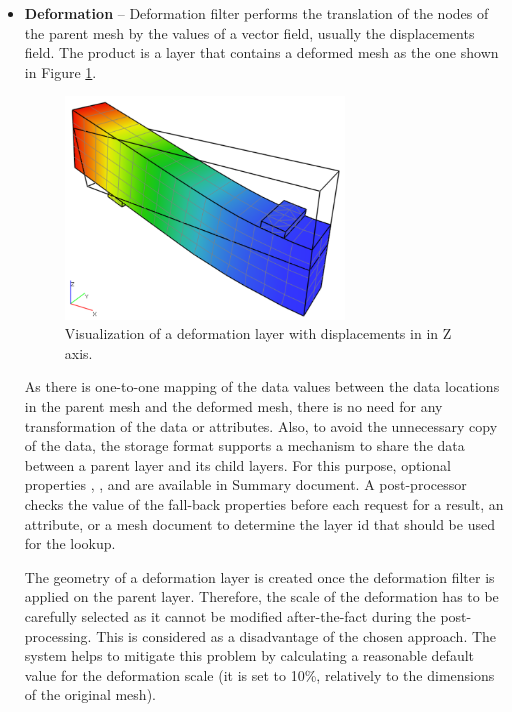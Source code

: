 \begin{itemize}

    \item \textbf{Deformation} -- Deformation filter performs the translation of the nodes of the parent mesh by the values of a vector field, usually the displacements field. The product is a layer that contains a deformed mesh as the one shown in Figure \ref{fig:beam-deformation-layer}.

    \begin{figure}[H]
        \centering
        \includegraphics[width=0.7\textwidth]{figures/chapter-data-management/beam-deformation-layer}
        \decoRule
        \caption[Visualization of a deformation layer]{Visualization of a deformation layer with displacements in in Z axis.}
        \label{fig:beam-deformation-layer}
    \end{figure}
    
    As there is one-to-one mapping of the data values between the data locations in the parent mesh and the deformed mesh, there is no need for any transformation of the data or attributes. Also, to avoid the unnecessary copy of the data, the storage format supports a mechanism to share the data between a parent layer and its child layers. For this purpose, optional properties , , and  are available in Summary document. A post-processor checks the value of the fall-back properties before each request for a result, an attribute, or a mesh document to determine the layer id that should be used for the lookup.
    
    The geometry of a deformation layer is created once the deformation filter is applied on the parent layer. Therefore, the scale of the deformation has to be carefully selected as it cannot be modified after-the-fact during the post-processing. This is considered as a disadvantage of the chosen approach. The system helps to mitigate this problem by calculating a reasonable default value for the deformation scale (it is set to 10\%, relatively to the dimensions of the original mesh).


\end{itemize}
